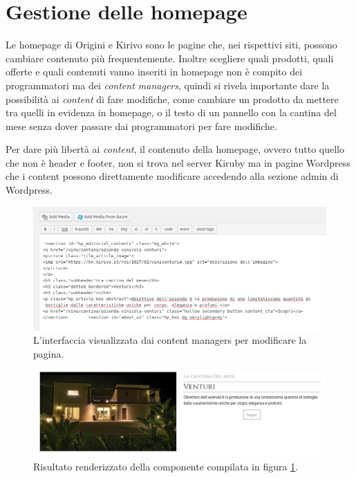 \section{Gestione delle homepage} 	

Le homepage di Origini e Kirivo sono le pagine che, nei rispettivi siti, possono cambiare contenuto più 
frequentemente. Inoltre scegliere quali prodotti, quali offerte e quali contenuti 
vanno inseriti in homepage non è compito dei programmatori ma dei \emph{content managers},
quindi si rivela importante dare la possibilità ai \emph{content} di fare modifiche, come cambiare un prodotto da
mettere tra quelli in evidenza in homepage, o il testo di un pannello con la cantina del mese senza dover passare 
dai programmatori per fare modifiche.

Per dare più libertà ai \emph{content}, il contenuto della homepage, ovvero tutto quello che non è
header e footer, non si trova nel server Kiruby ma in pagine Wordpress che i content possono direttamente 
modificare accedendo alla sezione admin di Wordpress.

\begin{figure}
  \includegraphics[width=\textwidth]{figure/whtml.png}
  \caption{L'interfaccia visualizzata dai content managers per modificare la pagina.}
  \label{fig:whtml}
\end{figure}

\begin{figure}
  \includegraphics[width=\textwidth]{figure/wrender.png}
  \caption{Risultato renderizzato della componente compilata in figura \ref{fig:whtml}.}
  \label{fig:wrender}
\end{figure}


